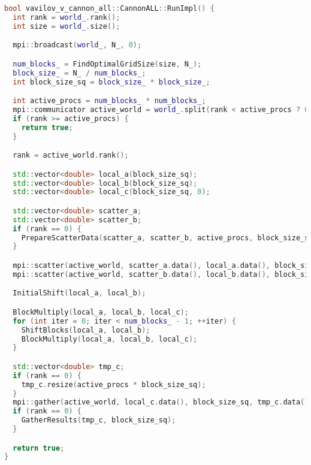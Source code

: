 \documentclass[a4paper,12pt]{article}
\begin{document}
\begin{lstlisting}[language=C++]
bool vavilov_v_cannon_all::CannonALL::RunImpl() {
  int rank = world_.rank();
  int size = world_.size();

  mpi::broadcast(world_, N_, 0);

  num_blocks_ = FindOptimalGridSize(size, N_);
  block_size_ = N_ / num_blocks_;
  int block_size_sq = block_size_ * block_size_;

  int active_procs = num_blocks_ * num_blocks_;
  mpi::communicator active_world = world_.split(rank < active_procs ? 0 : MPI_UNDEFINED);
  if (rank >= active_procs) {
    return true;
  }

  rank = active_world.rank();

  std::vector<double> local_a(block_size_sq);
  std::vector<double> local_b(block_size_sq);
  std::vector<double> local_c(block_size_sq, 0);

  std::vector<double> scatter_a;
  std::vector<double> scatter_b;
  if (rank == 0) {
    PrepareScatterData(scatter_a, scatter_b, active_procs, block_size_sq);
  }

  mpi::scatter(active_world, scatter_a.data(), local_a.data(), block_size_sq, 0);
  mpi::scatter(active_world, scatter_b.data(), local_b.data(), block_size_sq, 0);

  InitialShift(local_a, local_b);

  BlockMultiply(local_a, local_b, local_c);
  for (int iter = 0; iter < num_blocks_ - 1; ++iter) {
    ShiftBlocks(local_a, local_b);
    BlockMultiply(local_a, local_b, local_c);
  }

  std::vector<double> tmp_c;
  if (rank == 0) {
    tmp_c.resize(active_procs * block_size_sq);
  }
  mpi::gather(active_world, local_c.data(), block_size_sq, tmp_c.data(), 0);
  if (rank == 0) {
    GatherResults(tmp_c, block_size_sq);
  }

  return true;
}
\end{lstlisting}
\end{document}
